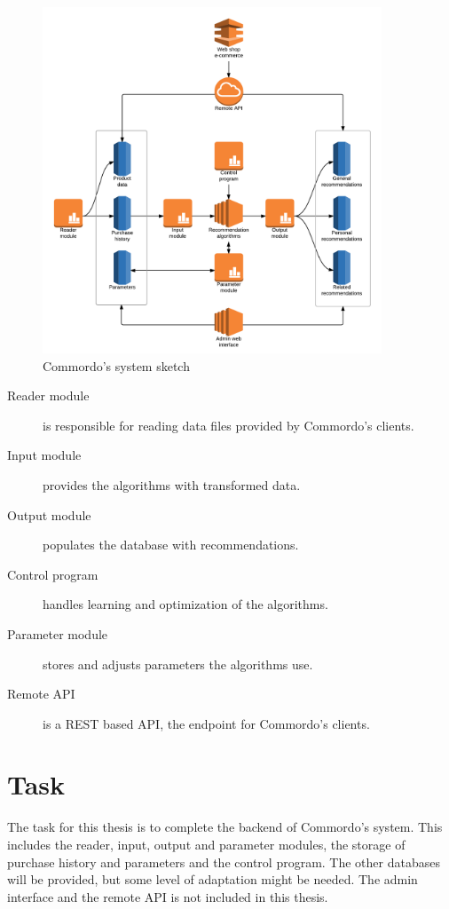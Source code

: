 \begin{figure}[h!]
  \centering
    \includegraphics[width=0.9\textwidth]{fig/system_overview.png}
  \caption{Commordo's system sketch}
  \label{fig:sysoverview}
\end{figure}

\FloatBarrier

\begin{description}
    \item[Reader module] is responsible for reading data files provided by Commordo's clients.
    \item[Input module] provides the algorithms with transformed data.
    \item[Output module] populates the database with recommendations.
    \item[Control program] handles learning and optimization of the algorithms.
    \item[Parameter module] stores and adjusts parameters the algorithms use.
    \item[Remote API] is a REST based API, the endpoint for Commordo's clients.
\end{description}


\section{Task}\label{sec:task}

The task for this thesis is to complete the backend of Commordo's system. This includes the reader, input, output and parameter modules, the storage of purchase history and parameters and the control program. The other databases will be provided, but some level of adaptation might be needed. The admin interface and the remote API is not included in this thesis.

